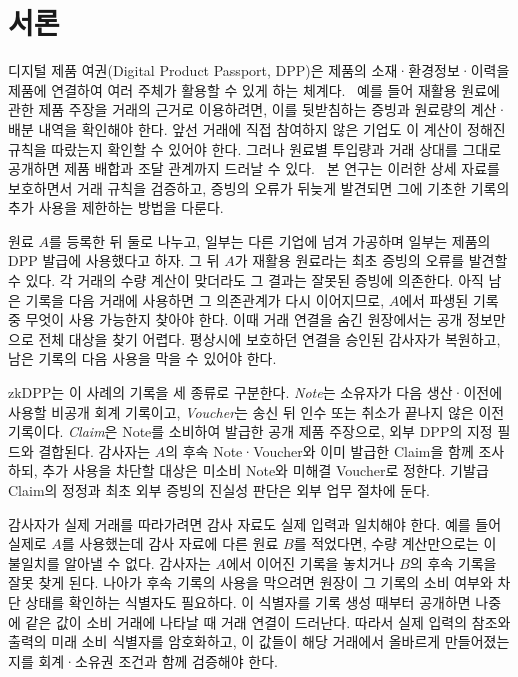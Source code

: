 \section{서론}
\label{sec:introduction}

디지털 제품 여권(Digital Product Passport, DPP)은 제품의
소재·환경정보·이력을 제품에 연결하여 여러 주체가 활용할 수 있게
하는 체계다.~\cite{ec-dpp-overview}
예를 들어 재활용 원료에 관한 제품 주장을 거래의 근거로 이용하려면,
이를 뒷받침하는 증빙과 원료량의 계산·배분 내역을 확인해야 한다.
앞선 거래에 직접 참여하지 않은 기업도 이 계산이 정해진 규칙을
따랐는지 확인할 수 있어야 한다. 그러나 원료별 투입량과 거래 상대를
그대로 공개하면 제품 배합과 조달 관계까지 드러날 수
있다.~\cite{udokwu-crass-2026}
본 연구는 이러한 상세 자료를 보호하면서 거래 규칙을 검증하고,
증빙의 오류가 뒤늦게 발견되면 그에 기초한 기록의 추가 사용을
제한하는 방법을 다룬다.

원료 $A$를 등록한 뒤 둘로 나누고, 일부는 다른 기업에 넘겨
가공하며 일부는 제품의 DPP 발급에 사용했다고 하자.
그 뒤 $A$가 재활용 원료라는 최초 증빙의 오류를 발견할 수 있다.
각 거래의 수량 계산이 맞더라도 그 결과는 잘못된 증빙에 의존한다.
아직 남은 기록을 다음 거래에 사용하면 그 의존관계가 다시 이어지므로,
$A$에서 파생된 기록 중 무엇이 사용 가능한지 찾아야 한다.
이때 거래 연결을 숨긴 원장에서는 공개 정보만으로 전체 대상을
찾기 어렵다. 평상시에 보호하던 연결을 승인된 감사자가 복원하고,
남은 기록의 다음 사용을 막을 수 있어야 한다.

zkDPP는 이 사례의 기록을 세 종류로 구분한다.
\emph{Note}는 소유자가 다음 생산·이전에 사용할 비공개 회계 기록이고,
\emph{Voucher}는 송신 뒤 인수 또는 취소가 끝나지 않은 이전 기록이다.
\emph{Claim}은 Note를 소비하여 발급한 공개 제품 주장으로,
외부 DPP의 지정 필드와 결합된다.
감사자는 $A$의 후속 Note·Voucher와 이미 발급한 Claim을 함께
조사하되, 추가 사용을 차단할 대상은 미소비 Note와 미해결 Voucher로
정한다. 기발급 Claim의 정정과 최초 외부 증빙의 진실성 판단은
외부 업무 절차에 둔다.

감사자가 실제 거래를 따라가려면 감사 자료도 실제 입력과 일치해야 한다.
예를 들어 실제로 $A$를 사용했는데 감사 자료에 다른 원료 $B$를
적었다면, 수량 계산만으로는 이 불일치를 알아낼 수 없다.
감사자는 $A$에서 이어진 기록을 놓치거나 $B$의 후속 기록을 잘못
찾게 된다. 나아가 후속 기록의 사용을 막으려면 원장이 그 기록의
소비 여부와 차단 상태를 확인하는 식별자도 필요하다.
이 식별자를 기록 생성 때부터 공개하면 나중에 같은 값이 소비 거래에
나타날 때 거래 연결이 드러난다. 따라서 실제 입력의 참조와 출력의
미래 소비 식별자를 암호화하고, 이 값들이 해당 거래에서 올바르게
만들어졌는지를 회계·소유권 조건과 함께 검증해야 한다.

